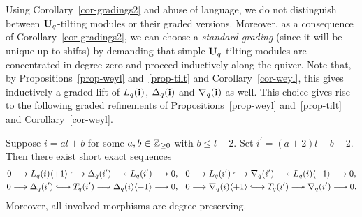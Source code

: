 Using Corollary~\ref{cor-gradings2} and 
abuse of language, we do not distinguish 
between $\boldsymbol{\mathrm{U}}_q$-tilting modules or their graded versions.
Moreover, as a consequence of 
Corollary~\ref{cor-gradings2}, we can 
choose a \textit{standard grading} 
(since it will be unique up to shifts) 
by demanding that simple $\boldsymbol{\mathrm{U}}_q$-tilting modules 
are concentrated in degree zero and 
proceed inductively along the quiver. 
Note that, by Propositions~\ref{prop-weyl} 
and~\ref{prop-tilt} and Corollary~\ref{cor-weyl}, 
this gives inductively a graded lift of 
$L_q({\boldsymbol{\mathrm{i}}})$, $\Delta_q({\boldsymbol{\mathrm{i}}})$ and $\nabla_q({\boldsymbol{\mathrm{i}}})$ as well. 
This choice gives rise to the following graded 
refinements of Propositions~\ref{prop-weyl} 
and~\ref{prop-tilt} and Corollary~\ref{cor-weyl}.



\begin{prop}\label{prop-refine}
Suppose $i=al+b$ for some $a,b\in\mathbb{Z}_{\geq 0}$ with 
$b\leq l-2$. Set $i^{\prime}=(a+2)l-b-2$. 
Then there
exist short exact sequences
\begin{gather*}
0\longrightarrow \Ln{i}\langle+1\rangle\hooklongrightarrow\Vn{i^{\prime}}\twoheadlongrightarrow \Ln{i^{\prime}}\longrightarrow 0,
\hspace*{0.25cm}
0\longrightarrow \Ln{i^{\prime}}\hooklongrightarrow\dVn{i^{\prime}}\twoheadlongrightarrow \Ln{i}\langle-1\rangle\longrightarrow 0,
\\
0\longrightarrow \Vn{i^{\prime}}\hooklongrightarrow\Tn{i^{\prime}}\twoheadlongrightarrow \Vn{i}\langle-1\rangle\longrightarrow 0,
\hspace*{0.25cm}
0\longrightarrow \dVn{i}\langle+1\rangle\hooklongrightarrow\Tn{i^{\prime}}\twoheadlongrightarrow \dVn{i^{\prime}}\longrightarrow 0.
\end{gather*}
Moreover, all involved morphisms are degree preserving.\makeqed
\end{prop}



